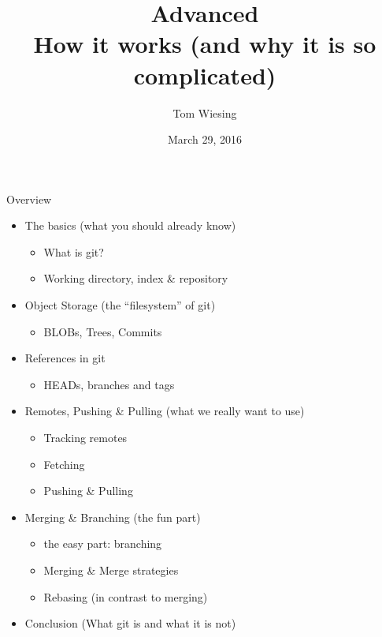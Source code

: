 \documentclass{beamer}
\title{Advanced \logoimage{imgs/git_logo}{40px}\\How it works (and why it is so complicated)}
\author{Tom Wiesing}
\institute{KWARC second hour talk}
\date{March 29, 2016}
\begin{document}
    \frame{\titlepage}
    
    \begin{frame}{Overview}
      \begin{itemize}
        \item The basics (what you should already know)
        \begin{itemize}
          \item What is git?
          \item Working directory, index \& repository
        \end{itemize}
          
          \item Object Storage (the ``filesystem'' of git)
          \begin{itemize}
            \item BLOBs, Trees, Commits
          \end{itemize}
          
          \item References in git
          \begin{itemize}
            \item HEADs, branches and tags
          \end{itemize}
          
          \item Remotes, Pushing \& Pulling (what we really want to use)
          \begin{itemize}
            \item Tracking remotes
            \item Fetching
            \item Pushing \& Pulling
          \end{itemize}
                   
          \item Merging \& Branching (the fun part)
          \begin{itemize}
            \item the easy part: branching
            \item Merging \& Merge strategies
            \item Rebasing (in contrast to merging)
          \end{itemize}
          
          \item Conclusion (What git is and what it is not)
      \end{itemize}
    \end{frame}
    
\end{document}
